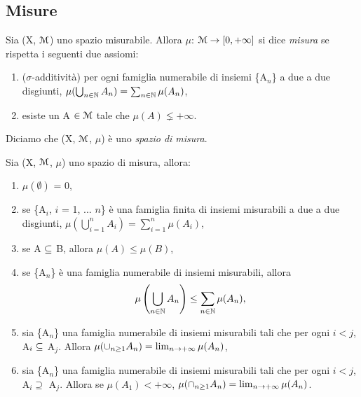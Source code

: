 \documentclass[Completo.tex]{subfiles}
\begin{document}
	\subsection{Misure}
	\begin{Def}
		Sia (X, $\eu[M]$) uno spazio misurabile. Allora $\mu$: $\eu[M] \ra [0, +\infty]$ si dice \textit{misura} se rispetta i seguenti due assiomi:
		\begin{enumerate}
			\item ($\sigma$-additività) per ogni famiglia numerabile di insiemi \{A$_n$\} a due a due disgiunti, $\mu(\bigcup_{n \in \bb[N]} A_n) = \sum_{n \in \bb[N]} \mu(A_n)$,
			\item esiste un A $\in \eu[M]$ tale che $\mu(A) \lneq +\infty$.
		\end{enumerate}
		Diciamo che (X, $\eu[M]$, $\mu$) è uno \textit{spazio di misura}.
	\end{Def}
	\begin{eTh}
		Sia (X, $\eu[M]$, $\mu$) uno spazio di misura, allora:
		\begin{enumerate}
			\item $\mu(\emptyset)$ = 0,
			\item se \{A$_i$, $i$ = 1, ... $n$\} è una famiglia finita di insiemi  misurabili a due a due disgiunti,  $\mu(\bigcup_{i=1}^{n} A_i) = \sum_{i =1}^{n} \mu(A_i)$,
			\item se A $\subseteq$ B, allora $\mu(A) \leq \mu(B)$,
			\item se \{A$_n$\} è una famiglia numerabile di insiemi misurabili, allora
			\begin{equation*}
			\mu\left(\bigcup_{n \in \bb[N]} A_n\right) \leq \sum_{n \in \bb[N]} \mu(A_n),
			\end{equation*}
			\item sia \{A$_n$\} una famiglia numerabile di insiemi misurabili tali che per ogni $i < j$, A$_i \subseteq$ A$_j$. Allora $\mu(\cup_{n\geq1}A_n) = \lim_{n \rightarrow +\infty} \mu(A_n)$,
			\item sia \{A$_n$\} una famiglia numerabile di insiemi misurabili tali che per ogni $i < j$, A$_i \supseteq$ A$_j$. Allora se $\mu(A_1) < +\infty$, $\mu(\cap_{n\geq1}A_n) = \lim_{n \rightarrow +\infty} \mu(A_n)$.
		\end{enumerate}
	\end{eTh}
\end{document}
